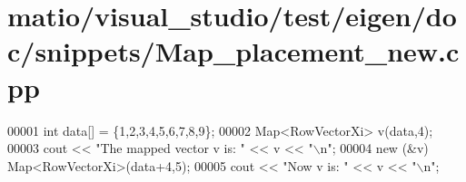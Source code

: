\hypertarget{matio_2visual__studio_2test_2eigen_2doc_2snippets_2_map__placement__new_8cpp_source}{}\section{matio/visual\+\_\+studio/test/eigen/doc/snippets/\+Map\+\_\+placement\+\_\+new.cpp}
\label{matio_2visual__studio_2test_2eigen_2doc_2snippets_2_map__placement__new_8cpp_source}

\begin{DoxyCode}
00001 \textcolor{keywordtype}{int} data[] = \{1,2,3,4,5,6,7,8,9\};
00002 Map<RowVectorXi> v(data,4);
00003 cout << \textcolor{stringliteral}{"The mapped vector v is: "} << v << \textcolor{stringliteral}{"\(\backslash\)n"};
00004 \textcolor{keyword}{new} (&v) Map<RowVectorXi>(data+4,5);
00005 cout << \textcolor{stringliteral}{"Now v is: "} << v << \textcolor{stringliteral}{"\(\backslash\)n"};
\end{DoxyCode}
